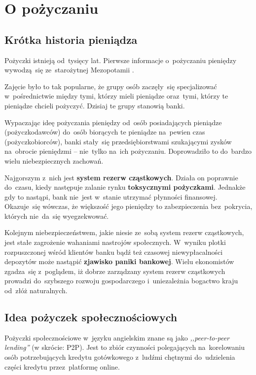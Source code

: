 \documentclass[a4paper,twoside,titlepage,openright]{book}
\begin{document}
\clearpage{\pagestyle{empty}\cleardoublepage}
\chapter{O pożyczaniu}
\section{Krótka historia pieniądza}
Pożyczki istnieją od~tysięcy lat. Pierwsze informacje o~pożyczaniu pieniędzy wywodzą~się ze~starożytnej Mezopotamii \cite{financingCivilization}. 

Zajęcie było to tak popularne, że grupy osób zaczęły~się specjalizować w~pośrednictwie między tymi, którzy mieli pieniądze oraz~tymi, którzy te pieniądze chcieli pożyczyć. Dzisiaj te grupy stanowią banki. 

Wypaczając ideę pożyczania pieniędzy od~osób posiadających pieniądze (pożyczkodawców) do~osób biorących te pieniądze na~pewien czas (pożyczkobiorców), banki stały~się przedsiębiorstwami szukającymi zysków na~obrocie pieniędzmi -- nie~tylko na~ich pożyczaniu. Doprowadziło to do~bardzo wielu niebezpiecznych zachowań. 

Najgorszym z~nich jest \textbf{system rezerw cząstkowych}. Działa on poprawnie do~czasu, kiedy następuje zalanie rynku \textbf{toksycznymi pożyczkami}. Jednakże gdy to nastąpi, bank nie~jest w~stanie utrzymać płynności finansowej. Okazuje~się wówczas, że większość jego pieniędzy to zabezpieczenia bez~pokrycia, których nie~da~się wyegzekwować. 

Kolejnym niebezpieczeństwem, jakie niesie ze~sobą system rezerw cząstkowych, jest stałe zagrożenie wahaniami nastrojów społecznych. W~wyniku plotki rozpuszczonej wśród klientów banku bądź też czasowej niewypłacalności depozytów może nastąpić \textbf{zjawisko paniki bankowej}. Wielu ekonomistów zgadza~się z~poglądem, iż dobrze zarządzany system rezerw cząstkowych prowadzi do~szybszego rozwoju gospodarczego i~uniezależnia bogactwo kraju od~złóż naturalnych.\cite{fractionalReserveBanking}

\section{Idea pożyczek społecznościowych}
Pożyczki społecznościowe w~języku angielskim znane są jako \textit{,,peer-to-peer lending''} (w skrócie: P2P). Jest to zbiór czynności polegających na~korelowaniu osób potrzebujących kredytu gotówkowego z~ludźmi chętnymi do~udzielenia części kredytu przez~platformę online.\cite{P2P} 
\end{document}

